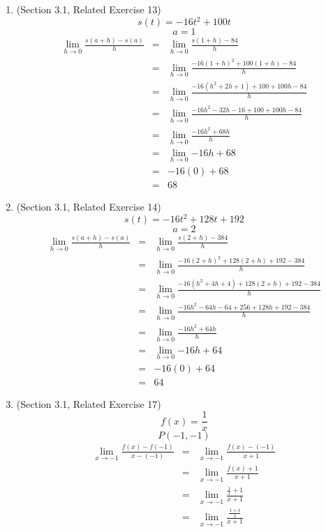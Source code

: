 \documentclass{article}
\begin{document}
\begin{enumerate}
    \item (Section 3.1, Related Exercise 13)
    $$s(t) = -16t^2 + 100t$$
    $$a = 1$$
    \begin{eqnarray}
        \lim_{h \to 0}{\frac{s(a + h) - s(a)}{h}} &=& \lim_{h \to 0}{\frac{s(1 + h) - 84}{h}} \\
        &=& \lim_{h \to 0}{\frac{-16(1 + h)^2 + 100(1 + h) - 84}{h}} \\
        &=& \lim_{h \to 0}{\frac{-16(h^2 + 2h + 1) + 100 + 100h - 84}{h}} \\
        &=& \lim_{h \to 0}{\frac{-16h^2 - 32h - 16 + 100 + 100h - 84}{h}} \\
        &=& \lim_{h \to 0}{\frac{-16h^2 + 68h}{h}} \\
        &=& \lim_{h \to 0}{-16h + 68} \\
        &=& -16(0) + 68 \\
        &=& 68
    \end{eqnarray}
    \item (Section 3.1, Related Exercise 14)
    $$s(t) = -16t^2 + 128t + 192$$
    $$a = 2$$
    \begin{eqnarray}
        \lim_{h \to 0}{\frac{s(a + h) - s(a)}{h}} &=& \lim_{h \to 0}{\frac{s(2 + h) - 384}{h}} \\
        &=& \lim_{h \to 0}{\frac{-16(2 + h)^2 + 128(2 + h) + 192 - 384}{h}} \\
        &=& \lim_{h \to 0}{\frac{-16(h^2 + 4h + 4) + 128(2 + h) + 192 - 384}{h}} \\
        &=& \lim_{h \to 0}{\frac{-16h^2 - 64h - 64 + 256 + 128h + 192 - 384}{h}} \\
        &=& \lim_{h \to 0}{\frac{-16h^2 + 64h}{h}} \\
        &=& \lim_{h \to 0}{-16h + 64} \\
        &=& -16(0) + 64 \\
        &=& 64
    \end{eqnarray}
    \item (Section 3.1, Related Exercise 17)
    $$f(x) = \frac{1}{x}$$
    $$P(-1, -1)$$
    \begin{eqnarray}
        \lim_{x \to -1}{\frac{f(x) - f(-1)}{x - (-1)}} &=& \lim_{x \to -1}{\frac{f(x) - (-1)}{x + 1}} \\
        &=& \lim_{x \to -1}{\frac{f(x) + 1}{x + 1}} \\
        &=& \lim_{x \to -1}{\frac{\frac{1}{x} + 1}{x + 1}} \\
        &=& \lim_{x \to -1}{\frac{\frac{1+x}{x}}{x + 1}} \\

\end{eqnarray}
\end{enumerate}
\end{document}
